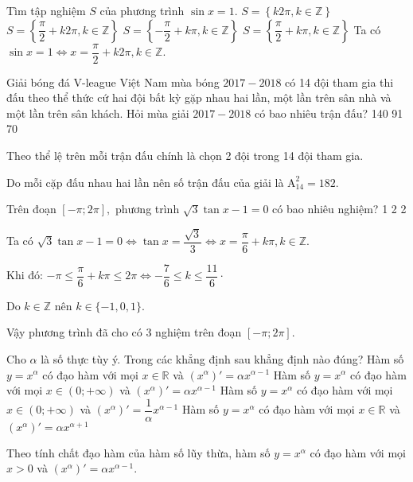 \begin{ex}%
Tìm tập nghiệm $S$ của phương trình $\sin x = 1$. 
	\choice
	{$S=\left\{k 2 \pi, k \in \mathbb{Z}\right\}$}
	{\True $ S  = \left\{ \dfrac{\pi }{2} + k2 \pi, k \in \mathbb{Z} \right\}$}
	{$ S  = \left\{ - \dfrac{\pi }{2} + k \pi , k \in \mathbb{Z}\right\}$}
	{$ S  = \left\{ \dfrac{\pi }{2} + k \pi , k \in \mathbb{Z}\right\}$}
	\loigiai
	{
Ta có $ \sin x = 1 \Leftrightarrow 	x = \dfrac{\pi }{2} + k2 \pi, k \in \mathbb{Z}. $	
	}
\end{ex}	
\begin{ex}%
	Giải bóng đá V-league Việt Nam mùa bóng $ 2017-2018 $ có 14 đội tham gia thi đấu theo thể thức cứ hai đội bất kỳ gặp nhau hai lần, một lần trên sân nhà và một lần trên sân khách. Hỏi mùa giải $ 2017-2018 $ có bao nhiêu trận đấu?
	\choice
	{140}
	{}
	{91}
	{70}
	\loigiai
	{	
	
	Theo thể lệ trên mỗi trận đấu chính là chọn 2 đội trong 14 đội tham gia. 
	
	Do mỗi cặp đấu nhau hai lần nên số trận đấu của giải là $\mathrm{A}_{14}^2 = 182.  $	
	}
\end{ex}	
\begin{ex}%
	Trên đoạn $ [-\pi; 2\pi],  $ phương trình $ \sqrt{3} \tan x - 1 = 0 $ có bao nhiêu nghiệm?
	\choice
	{1}
	{2}
	{}
	{2}
	\loigiai
	{	
	
	Ta có 	$ \sqrt{3} \tan x - 1 = 0 \Leftrightarrow \tan x = \dfrac{\sqrt{3}}{3} \Leftrightarrow x = \dfrac{\pi}{6} + k \pi, k \in \mathbb{Z}$.
	
	Khi đó: $ - \pi \leq \dfrac{\pi}{6} + k \pi \leq 2\pi   \Leftrightarrow -\dfrac{7}{6} \leq k \leq \dfrac{11}{6} \cdot $
	
	Do $ k \in \mathbb{Z} $ nên $ k \in \{-1, 0, 1\} $.
	
	Vậy phương trình đã cho có 3 nghiệm trên đoạn $ [-\pi;2\pi ]. $
	}
\end{ex}	
\begin{ex}%
Cho $ \alpha  $	 là số thực tùy ý. Trong các khẳng định sau khẳng định nào đúng?
	\choice
	{Hàm số $ y = x^ \alpha $ có đạo hàm với mọi $ x \in \mathbb{R} $ và $ \left(x^ \alpha\right)' = \alpha x^{\alpha -1} $}
	{\True Hàm số $ y = x^ \alpha $ có đạo hàm với mọi $ x \in (0;+ \infty) $ và $ \left(x^ \alpha\right)' = \alpha x^{\alpha -1} $ }
	{Hàm số $ y = x^ \alpha $ có đạo hàm với mọi $ x \in (0;+ \infty) $ và $ \left(x^ \alpha\right)' = \dfrac{1}{\alpha} x^{\alpha -1} $ }
	{Hàm số $ y = x^ \alpha $ có đạo hàm với mọi $ x \in \mathbb{R} $ và $ \left(x^ \alpha\right)' = \alpha x^{\alpha +1} $}
	\loigiai
	{	

	Theo tính chất đạo hàm của hàm số lũy thừa,  hàm số $ y = x^ \alpha $ có đạo hàm với mọi $ x > 0 $ và $ \left(x^ \alpha\right)' = \alpha x^{\alpha -1}. $ 	
	}
\end{ex}	
